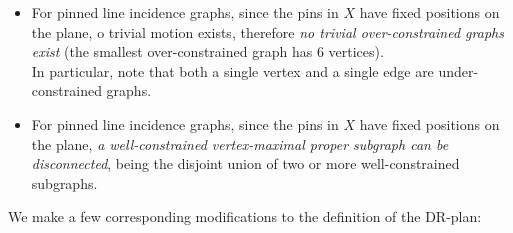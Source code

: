 \begin{itemize}

\item For pinned line incidence graphs,
since the pins in $X$ have fixed positions on the plane,
o trivial motion exists, therefore {\em no trivial over-constrained graphs exist} (the smallest over-constrained graph has $6$ vertices).\\
In particular, note that both a single vertex and a single edge are under-constrained graphs.


\item
For pinned line incidence graphs,
since the pins in $X$ have fixed positions on the plane,
{\em a well-constrained vertex-maximal proper subgraph can be disconnected},
being the disjoint union of two or more well-constrained subgraphs. \\

\end{itemize}

We make  a few corresponding modifications to the definition of the DR-plan:


